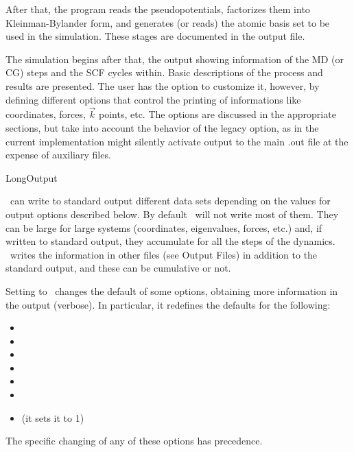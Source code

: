 After that, the program reads the pseudopotentials, factorizes them
into Kleinman-Bylander form, and generates (or reads) the atomic basis
set to be used in the simulation. These stages are documented in the
output file.

The simulation begins after that, the output showing information of
the MD (or CG) steps and the SCF cycles within.  Basic descriptions of
the process and results are presented. The user has the option to
customize it, however, by defining
different options that control the printing of informations like
coordinates, forces, $\vec k$ points, etc.  The options are discussed
in the appropriate sections, but take into account the behavior of the
legacy  option, as in the current implementation might
silently activate output to the main .out file at the expense of
auxiliary files.

\begin{fdflogicalF}{LongOutput}

  \siesta\ can write to standard output different data sets depending
  on the values for output options described below.  By default
  \siesta\ will not write most of them. They can be large for large
  systems (coordinates, eigenvalues, forces, etc.)  and, if written to
  standard output, they accumulate for all the steps of the
  dynamics. \siesta\ writes the information in other files (see Output
  Files) in addition to the standard output, and these can be
  cumulative or not.

  Setting  to \fdftrue\ changes the default of some
  options, obtaining more information in the output (verbose).  In
  particular, it redefines the defaults for the following:

  \begin{itemize}
    
    \item {}%
    
    \item {}%

    \item {}%

    \item {}%

    \item {}%
    
    \item {}%
    
    \item {}%
    (it sets it to 1)

  \end{itemize}

  The specific changing of any of these options has precedence.
  
\end{fdflogicalF}


